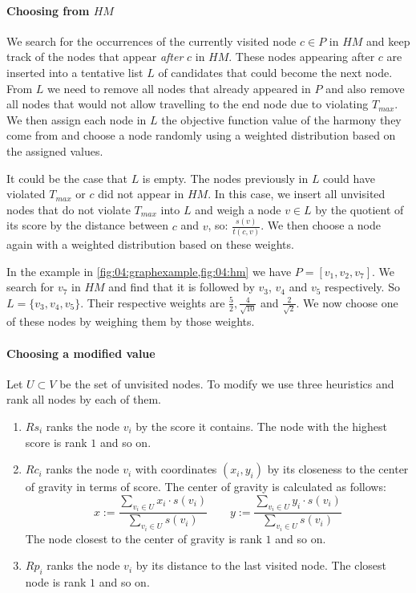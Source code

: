 \paragraph{Choosing from $HM$}

We search for the occurrences of the currently visited node $c \in P$ in $HM$ and keep track of the nodes that appear \emph{after} $c$ in $HM$.
These nodes appearing after $c$ are inserted into a tentative list $L$ of candidates that could become the next node.
From $L$ we need to remove all nodes that already appeared in $P$ and also remove all nodes that would not allow travelling to the end node due to violating $T_{max}$.
We then assign each node in $L$ the objective function value of the harmony they come from and choose a node randomly using a weighted distribution based on the assigned values.

It could be the case that $L$ is empty. The nodes previously in $L$ could have violated $T_{max}$ or $c$ did not appear in $HM$.
In this case, we insert all unvisited nodes that do not violate $T_{max}$ into $L$ and weigh a node $v \in L$ by the quotient of its score by the distance between $c$ and $v$, so: $\tfrac{s(v)}{t(c, v)}$.
We then choose a node again with a weighted distribution based on these weights.

In the example in \cref{fig:04:graphexample,fig:04:hm} we have $P = [v_1, v_2, v_7]$.
We search for $v_7$ in $HM$ and find that it is followed by $v_3$, $v_4$ and $v_5$ respectively.
So $L = \{v_3, v_4, v_5\}$. Their respective weights are $\tfrac{5}{2}, \tfrac{4}{\sqrt{10}}$ and $\tfrac{2}{\sqrt{2}}$.
We now choose one of these nodes by weighing them by those weights.

\label{par:04:choosemodified}
\paragraph{Choosing a modified value}

Let $U \subset V$ be the set of unvisited nodes.
To modify we use three heuristics and rank all nodes by each of them.

\begin{enumerate}
	\item $Rs_i$ ranks the node $v_i$ by the score it contains. The node with the highest score is rank $1$ and so on.
	\item $Rc_i$ ranks the node $v_i$ with coordinates $(x_i, y_i)$ by its closeness to the center of gravity in terms of score. The center of gravity is calculated as follows:
	      \begin{equation*}
		      x := \frac{\sum_{v_i \in U} x_i \cdot s(v_i)}{\sum_{v_i \in U} s(v_i)}\quad\quad
		      y := \frac{\sum_{v_i \in U} y_i \cdot s(v_i)}{\sum_{v_i \in U} s(v_i)}
	      \end{equation*}
	      The node closest to the center of gravity is rank $1$ and so on.
	\item $Rp_i$ ranks the node $v_i$ by its distance to the last visited node.
	      The closest node is rank $1$ and so on.
\end{enumerate}

